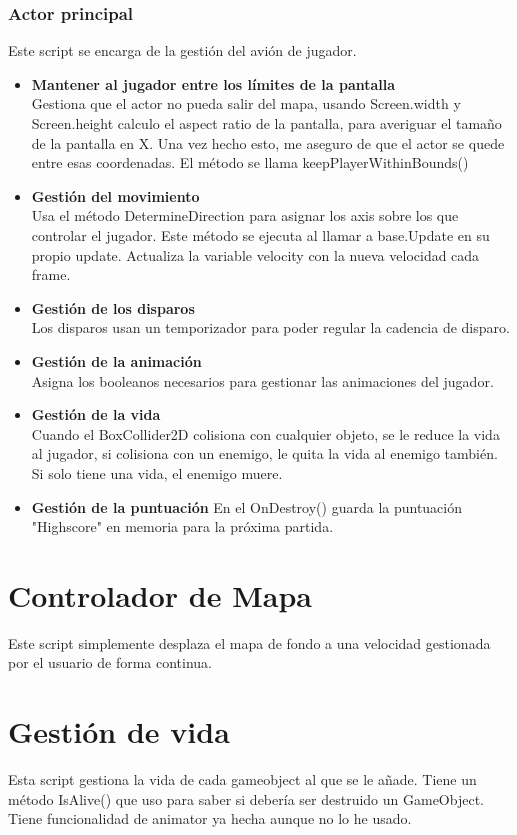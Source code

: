 \documentclass[titlepage, 4apaper]{article}
\begin{document}
\subsubsection{Actor principal}
Este script se encarga de la gestión del avión de jugador. 
\begin{itemize}
	\item \textbf{Mantener al jugador entre los límites de la pantalla}\\Gestiona que el actor no pueda salir del mapa, usando Screen.width y Screen.height calculo el aspect ratio de la pantalla, para averiguar el tamaño de la pantalla en X. Una vez hecho esto, me aseguro de que el actor se quede entre esas coordenadas. El método se llama keepPlayerWithinBounds()
	\item \textbf{Gestión del movimiento}\\Usa el método DetermineDirection para asignar los axis sobre los que controlar el jugador. Este método se ejecuta al llamar a base.Update en su propio update. Actualiza la variable velocity con la nueva velocidad cada frame.
	\item \textbf{Gestión de los disparos}\\Los disparos usan un temporizador para poder regular la cadencia de disparo.
	\item \textbf{Gestión de la animación}\\Asigna los booleanos necesarios para gestionar las animaciones del jugador.
	\item \textbf{Gestión de la vida}\\Cuando el BoxCollider2D colisiona con cualquier objeto, se le reduce la vida al jugador, si colisiona con un enemigo, le quita la vida al enemigo también. Si solo tiene una vida, el enemigo muere.
	\item \textbf{Gestión de la puntuación} En el OnDestroy() guarda la puntuación "Highscore" en memoria para la próxima partida.
\end{itemize}
\section{Controlador de Mapa}
Este script simplemente desplaza el mapa de fondo a una velocidad gestionada por el usuario de forma continua.
\section{Gestión de vida}
Esta script gestiona la vida de cada gameobject al que se le añade. Tiene un método IsAlive() que uso para saber si debería ser destruido un GameObject. Tiene funcionalidad de animator ya hecha aunque no lo he usado.
\end{document}

